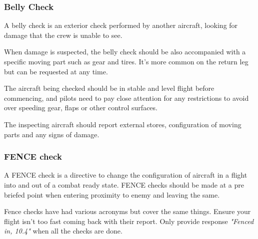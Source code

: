 \subsubsection{Belly Check}

A belly check is an exterior check performed by another aircraft, looking for
damage that the crew is unable to see.

When damage is suspected, the belly check should be also accompanied with a
specific moving part such as gear and tires. It's more common on the return leg
but can be requested at any time.

The aircraft being checked should be in stable and level flight before
commencing, and pilots need to pay close attention for any restrictions
to avoid over speeding gear, flaps or other control surfaces.

The inspecting aircraft should report external stores, configuration of moving
parts and any signs of damage.

\newpage

\subsubsection{FENCE check}

A FENCE check is a directive to change the configuration of aircraft in a
flight into and out of a combat ready state. FENCE checks should be made at a
pre briefed point when entering proximity to enemy and leaving the same.

Fence checks have had various acronyms but cover the same things. Ensure your
flight isn't too fast coming back with their report. Only provide response
\textit{"Fenced in, 10.4"} when all the checks are done.


